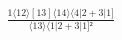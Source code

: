 \documentclass[varwidth, border=5pt]{standalone}
\begin{document}
\begin{my}
$\begin{gathered}
\scriptscriptstyle\frac{1⟨12⟩[13]⟨14⟩⟨4|2+3|1]}{⟨13⟩⟨1|2+3|1]²}
\end{gathered}$
\end{my}
\end{document}
